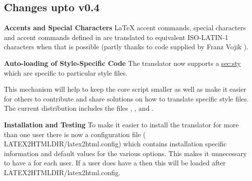 \subsection{Changes upto v0.4}
\begin{htmllist}
\item[\textbf{Accents and Special Characters}]
LaTeX accent commands, special characters and accent commands defined
in  are translated to equivalent ISO-LATIN-1
characters when that is possible (partly thanks to code supplied
by Franz Vojik ).
\item[\textbf{Auto-loading of Style-Specific Code}]
The translator now supports a 
\hyperref{mechanism for including Perl code extensions}{mechanism for
including Perl code extensions (see Section }{)}{sec:sty}
which are specific to particular style files. 


This mechanism will help to keep the core script smaller as well as make
it easier for others to contribute and share solutions on  
how to translate specific style files. The current distribution includes the files
, ,  and .
\item[\textbf{Installation and Testing}]
To make it easier to install the translator for more than one user
there is now a configuration file ({\fn
LATEX2HTMLDIR/latex2html.config}) which contains installation specific 
information and default values for the various options. 
This makes it unnecessary to have a  for
each user.
If a user does have a   then this will be
loaded after {\fn
LATEX2HTMLDIR/latex2html.config}.


\end{htmllist}
